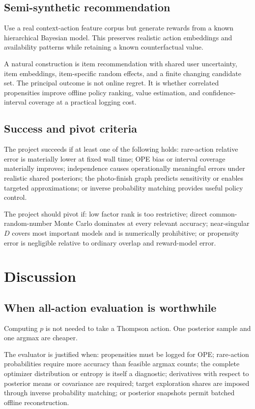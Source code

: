 \documentclass[11pt]{article}
\begin{document}
\subsection{Semi-synthetic recommendation}

Use a real context-action feature corpus but generate rewards from a known hierarchical Bayesian model. This preserves realistic action embeddings and availability patterns while retaining a known counterfactual value.

A natural construction is item recommendation with shared user uncertainty, item embeddings, item-specific random effects, and a finite changing candidate set. The principal outcome is not online regret. It is whether correlated propensities improve offline policy ranking, value estimation, and confidence-interval coverage at a practical logging cost.

\subsection{Success and pivot criteria}

The project succeeds if at least one of the following holds: rare-action relative error is materially lower at fixed wall time; OPE bias or interval coverage materially improves; independence causes operationally meaningful errors under realistic shared posteriors; the photo-finish graph predicts sensitivity or enables targeted approximations; or inverse probability matching provides useful policy control.

The project should pivot if: low factor rank is too restrictive; direct common-random-number Monte Carlo dominates at every relevant accuracy; near-singular $D$ covers most important models and is numerically prohibitive; or propensity error is negligible relative to ordinary overlap and reward-model error.

\section{Discussion}
\label{sec:discussion}

\subsection{When all-action evaluation is worthwhile}

Computing $p$ is not needed to take a Thompson action. One posterior sample and one argmax are cheaper.

The evaluator is justified when: propensities must be logged for OPE; rare-action probabilities require more accuracy than feasible argmax counts; the complete optimizer distribution or entropy is itself a diagnostic; derivatives with respect to posterior means or covariance are required; target exploration shares are imposed through inverse probability matching; or posterior snapshots permit batched offline reconstruction.
\end{document}
